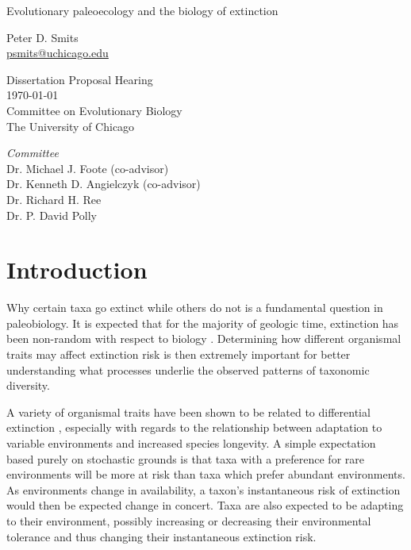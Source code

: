 \documentclass[12pt,letterpaper]{article}
\begin{document}
\begin{titlepage}
  \begin{center}
    \huge{Evolutionary paleoecology and the biology of extinction}

    \vspace{1.5cm}

    \large{Peter D. Smits \\}
    \footnotesize{\href{mailto:psmits@uchicago.edu}{psmits@uchicago.edu}}

    \vspace{1.5cm}

    Dissertation Proposal Hearing \\
    \today \\
    Committee on Evolutionary Biology \\
    The University of Chicago

    \vspace{1.5cm}

    \textit{Committee} \\
    Dr. Michael J. Foote (co-advisor) \\
    Dr. Kenneth D. Angielczyk (co-advisor) \\
    Dr. Richard H. Ree \\
    Dr. P. David Polly
  \end{center}
\end{titlepage}


\section{Introduction}
Why certain taxa go extinct while others do not is a fundamental question in paleobiology. It is expected that for the majority of geologic time, extinction has been non-random with respect to biology \citep{Jablonski1986,Alexander1977,Harnik2011,Johnson2002b,Kitchell1986,Nurnberg2013a,Payne2007}. Determining how different organismal traits may affect extinction risk is then extremely important for better understanding what processes underlie the observed patterns of taxonomic diversity. 

A variety of organismal traits have been shown to be related to differential extinction \citep{Foote2013,Liow2007b,Baumiller1993,Nurnberg2013a,Alexander1977,Kitchell1986}, especially with regards to the relationship between adaptation to variable environments and increased species longevity. A simple expectation based purely on stochastic grounds is that taxa with a preference for rare environments will be more at risk than taxa which prefer abundant environments. As environments change in availability, a taxon's instantaneous risk of extinction would then be expected change in concert. Taxa are also expected to be adapting to their environment, possibly increasing or decreasing their environmental tolerance and thus changing their instantaneous extinction risk. 
\end{document}
